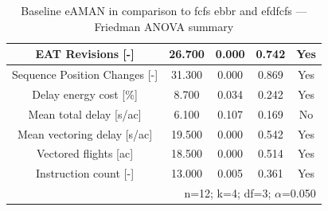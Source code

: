 \begin{table}[htbp]
\caption{Baseline eAMAN in comparison to fcfs ebbr and efdfcfs — Friedman ANOVA summary}
\begin{center}
\footnotesize
\setlength{\tabcolsep}{3pt}
\renewcommand{\arraystretch}{1.000}
\begin{tabular}{|c|c|c|c|c|}
\hline
EAT Revisions [-] & 26.700 & 0.000 & 0.742 & Yes \\
\hline
Sequence Position Changes [-] & 31.300 & 0.000 & 0.869 & Yes \\
\hline
Delay energy cost [\%] & 8.700 & 0.034 & 0.242 & Yes \\
\hline
Mean total delay [s/ac] & 6.100 & 0.107 & 0.169 & No \\
\hline
Mean vectoring delay [s/ac] & 19.500 & 0.000 & 0.542 & Yes \\
\hline
Vectored flights [ac] & 18.500 & 0.000 & 0.514 & Yes \\
\hline
Instruction count [-] & 13.000 & 0.005 & 0.361 & Yes \\
\hline
\multicolumn{5}{r}{n=12; k=4; df=3; $\alpha$=0.050}\\
\end{tabular}
\label{tab:baseline\_eaman\_in\_comparison\_to\_fcfs\_ebbr\_and\_efdfcfs\_friedman}
\end{center}
\end{table}